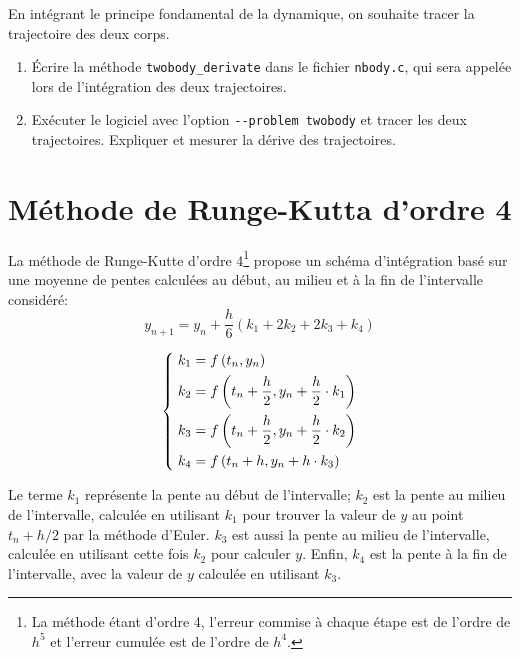 \documentclass[twoside, symmetric]{tufte-handout}
\begin{document}
En intégrant le principe fondamental de la dynamique, on souhaite tracer la
trajectoire des deux corps.

\begin{enumerate}
    \item Écrire la méthode \texttt{twobody\_derivate} dans le fichier
        \texttt{nbody.c}, qui sera appelée lors de l'intégration des deux
        trajectoires.
    \item Exécuter le logiciel avec l'option \verb+--problem twobody+ et
        tracer les deux trajectoires. Expliquer et mesurer la dérive des
        trajectoires.
\end{enumerate}

\section{Méthode de Runge-Kutta d'ordre 4}

La méthode de Runge-Kutte d'ordre 4\footnote{La méthode étant d'ordre 4,
l'erreur commise à chaque étape est de l'ordre de $h^5$ et l'erreur cumulée est
de l'ordre de $h^4$.  } propose un schéma d'intégration basé sur une moyenne de
pentes calculées au début, au milieu et à la fin de l'intervalle considéré:
\begin{equation}
    y_{n+1} = y_n + \frac{h}{6}\left( k_1 + 2k_2 + 2k_3 + k_4 \right)
    \label{eqn:rk4}
\end{equation}

\begin{equation}
    \begin{dcases}
        \;k_1 = f\left(t_n,y_n\right)\\
        \;k_2 = f\left( t_n+\frac{h}{2}, y_n + \frac{h}{2}\cdot k_1 \right)\\
        \;k_3 = f\left( t_n+\frac{h}{2}, y_n + \frac{h}{2}\cdot k_2 \right)\\
        \;k_4 = f\left( t_n + h, y_n + h\cdot k_3 \right)
    \end{dcases}
    \label{eqn:rk4_2}
\end{equation}

Le terme $k_1$ représente la pente au début de l'intervalle; $k_2$ est la pente
au milieu de l'intervalle, calculée en utilisant $k_1$ pour trouver la valeur de
$y$ au point $t_n + h/2$ par la méthode d'Euler. $k_3$ est aussi la pente au
milieu de l'intervalle, calculée en utilisant cette fois $k_2$ pour calculer
$y$. Enfin, $k_4$ est la pente à la fin de l'intervalle, avec la valeur de $y$
calculée en utilisant $k_3$.
\end{document}
